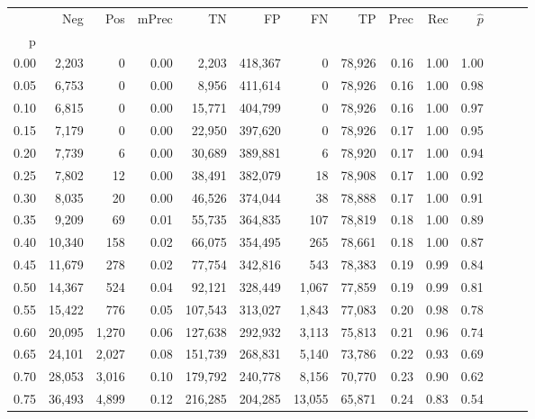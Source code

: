 \begin{tabular}{rrrrrrrrrrrrrr}
\toprule
{} &     Neg &     Pos & mPrec &       TN &       FP &      FN &      TP &  Prec &   Rec & $\hat{p}$ \\
p    &         &         &       &          &          &         &         &       &       &           \\
\midrule
0.00 &   2,203 &       0 &  0.00 &    2,203 &  418,367 &       0 &  78,926 &  0.16 &  1.00 &      1.00 \\
0.05 &   6,753 &       0 &  0.00 &    8,956 &  411,614 &       0 &  78,926 &  0.16 &  1.00 &      0.98 \\
0.10 &   6,815 &       0 &  0.00 &   15,771 &  404,799 &       0 &  78,926 &  0.16 &  1.00 &      0.97 \\
0.15 &   7,179 &       0 &  0.00 &   22,950 &  397,620 &       0 &  78,926 &  0.17 &  1.00 &      0.95 \\
0.20 &   7,739 &       6 &  0.00 &   30,689 &  389,881 &       6 &  78,920 &  0.17 &  1.00 &      0.94 \\
0.25 &   7,802 &      12 &  0.00 &   38,491 &  382,079 &      18 &  78,908 &  0.17 &  1.00 &      0.92 \\
0.30 &   8,035 &      20 &  0.00 &   46,526 &  374,044 &      38 &  78,888 &  0.17 &  1.00 &      0.91 \\
0.35 &   9,209 &      69 &  0.01 &   55,735 &  364,835 &     107 &  78,819 &  0.18 &  1.00 &      0.89 \\
0.40 &  10,340 &     158 &  0.02 &   66,075 &  354,495 &     265 &  78,661 &  0.18 &  1.00 &      0.87 \\
0.45 &  11,679 &     278 &  0.02 &   77,754 &  342,816 &     543 &  78,383 &  0.19 &  0.99 &      0.84 \\
0.50 &  14,367 &     524 &  0.04 &   92,121 &  328,449 &   1,067 &  77,859 &  0.19 &  0.99 &      0.81 \\
0.55 &  15,422 &     776 &  0.05 &  107,543 &  313,027 &   1,843 &  77,083 &  0.20 &  0.98 &      0.78 \\
0.60 &  20,095 &   1,270 &  0.06 &  127,638 &  292,932 &   3,113 &  75,813 &  0.21 &  0.96 &      0.74 \\
0.65 &  24,101 &   2,027 &  0.08 &  151,739 &  268,831 &   5,140 &  73,786 &  0.22 &  0.93 &      0.69 \\
0.70 &  28,053 &   3,016 &  0.10 &  179,792 &  240,778 &   8,156 &  70,770 &  0.23 &  0.90 &      0.62 \\
0.75 &  36,493 &   4,899 &  0.12 &  216,285 &  204,285 &  13,055 &  65,871 &  0.24 &  0.83 &      0.54 \\

\end{tabular}
